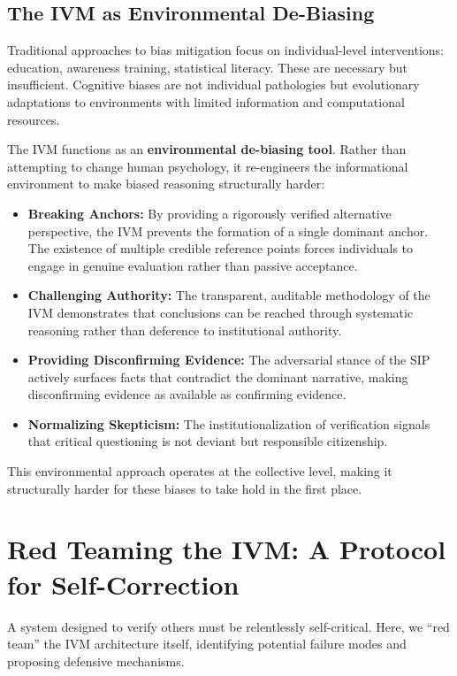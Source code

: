 \documentclass[11pt,a4paper]{article}
\begin{document}
\begin{small}
\subsection{The IVM as Environmental De-Biasing}

Traditional approaches to bias mitigation focus on individual-level interventions: education, awareness training, statistical literacy. These are necessary but insufficient. Cognitive biases are not individual pathologies but evolutionary adaptations to environments with limited information and computational resources.

The IVM functions as an \textbf{environmental de-biasing tool}. Rather than attempting to change human psychology, it re-engineers the informational environment to make biased reasoning structurally harder:

\begin{itemize}
    \item \textbf{Breaking Anchors:} By providing a rigorously verified alternative perspective, the IVM prevents the formation of a single dominant anchor. The existence of multiple credible reference points forces individuals to engage in genuine evaluation rather than passive acceptance.
    \item \textbf{Challenging Authority:} The transparent, auditable methodology of the IVM demonstrates that conclusions can be reached through systematic reasoning rather than deference to institutional authority.
    \item \textbf{Providing Disconfirming Evidence:} The adversarial stance of the SIP actively surfaces facts that contradict the dominant narrative, making disconfirming evidence as available as confirming evidence.
    \item \textbf{Normalizing Skepticism:} The institutionalization of verification signals that critical questioning is not deviant but responsible citizenship.
\end{itemize}

This environmental approach operates at the collective level, making it structurally harder for these biases to take hold in the first place.

\section{Red Teaming the IVM: A Protocol for Self-Correction}

A system designed to verify others must be relentlessly self-critical. Here, we ``red team'' the IVM architecture itself, identifying potential failure modes and proposing defensive mechanisms.


\end{small}
\end{document}
